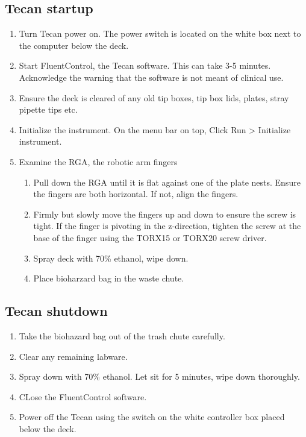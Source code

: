 \documentclass{article}
\begin{document}
\subsection{Tecan startup}
\label{sec:tecan-start}
\begin{enumerate}
\item Turn Tecan power on. The power switch is located on the white box next to the computer below the deck.
\item Start FluentControl, the Tecan software. This can take 3-5 minutes. Acknowledge the warning that the software is not meant of clinical use.
\item Ensure the deck is cleared of any old tip boxes, tip box lids, plates, stray pipette tips etc.
\item Initialize the instrument. On the menu bar on top, Click Run > Initialize instrument.
\item Examine the RGA, the robotic arm fingers
  \begin{enumerate}
  \item Pull down the RGA until it is flat against one of the plate nests. Ensure the fingers are both horizontal. If not, align the fingers.
  \item Firmly but slowly move the fingers up and down to ensure the screw is tight. If the finger is pivoting in the z-direction, tighten the screw at the base of the finger using the TORX15 or TORX20 screw driver.
  \item Spray deck with 70\% ethanol, wipe down.
  \item Place bioharzard bag in the waste chute.
  \end{enumerate}
\end{enumerate}


\subsection{Tecan shutdown}
\label{sec:tecan-shut}
\begin{enumerate}
\item Take the biohazard bag out of the trash chute carefully.
\item Clear any remaining labware.
\item Spray down with 70\% ethanol. Let sit for 5 minutes, wipe down thoroughly.
\item CLose the FluentControl software.
\item Power off the Tecan using the switch on the white controller box placed below the deck.
\end{enumerate}
\end{document}
